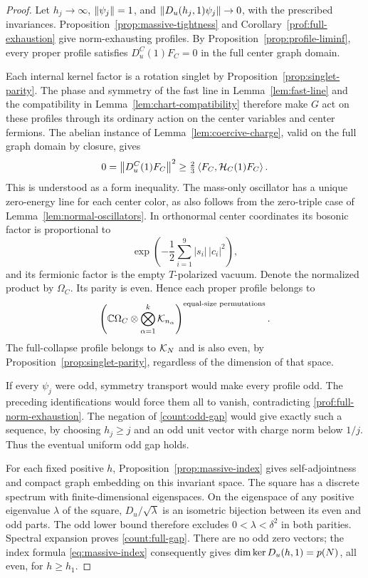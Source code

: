 \begin{proof}
Let \(h_j\to\infty\), \(\left\lVert \psi_j\right\rVert=1\), and
\(\left\lVert D_u(h_j,1)\psi_j\right\rVert\to0\), with the prescribed invariances.
Proposition~\ref{prop:massive-tightness} and
Corollary~\ref{prof:full-exhaustion} give norm-exhausting profiles. By
Proposition~\ref{prop:profile-liminf}, every proper profile satisfies
\(D_u^C(1)F_C=0\) in the full center graph domain.

Each internal kernel factor is a rotation singlet by
Proposition~\ref{prop:singlet-parity}. The phase and symmetry of the fast
line in Lemma~\ref{lem:fast-line} and the compatibility in
Lemma~\ref{lem:chart-compatibility} therefore make \(G\) act on these
profiles through its ordinary action on the center variables and center
fermions. The abelian instance of Lemma~\ref{lem:coercive-charge}, valid
on the full graph domain by closure, gives
\[
       0=\left\lVert D_u^C(1)F_C\right\rVert^2
          \ge\tfrac23\left\langle F_C,\mathcal H_C(1)F_C\right\rangle.
\]
This is understood as a form inequality. The mass-only oscillator has
a unique zero-energy line for each center color, as also follows from
the zero-triple case of Lemma~\ref{lem:normal-oscillators}. In orthonormal
center coordinates its bosonic factor is proportional to
\[
        \exp\left(-\frac12\sum_{i=1}^9|s_i|\,|c_i|^2\right),
\]
and its fermionic factor is the empty \(T\)-polarized vacuum. Denote the
normalized product by \(\Omega_C\). Its parity is even. Hence each proper
profile belongs to
\begin{equation}\label{count:proper-profile-kernel}
 \left(\mathbb C\Omega_C\otimes\bigotimes_{\alpha=1}^k\mathcal K_{n_\alpha}\right)
                  ^{\text{equal-size permutations}}.
\end{equation}
The full-collapse profile belongs to \(\mathcal K_N\) and is also even, by
Proposition~\ref{prop:singlet-parity}, regardless of the dimension of that
space.

If every \(\psi_j\) were odd, symmetry transport would make every profile
odd. The preceding identifications would force them all to vanish,
contradicting \eqref{prof:full-norm-exhaustion}. The negation of
\eqref{count:odd-gap} would give exactly such a sequence, by choosing
\(h_j\ge j\) and an odd unit vector with charge norm below \(1/j\).
Thus the eventual uniform odd gap holds.

For each fixed positive \(h\), Proposition~\ref{prop:massive-index} gives
self-adjointness and compact graph embedding on this invariant space.
The square has a discrete spectrum with finite-dimensional eigenspaces.
On the eigenspace of any positive eigenvalue \(\lambda\) of the square,
\(D_u/\sqrt\lambda\) is an isometric bijection between its even and odd
parts. The odd lower bound therefore excludes \(0<\lambda<\delta^2\)
in both parities. Spectral expansion proves
\eqref{count:full-gap}. There are no odd zero vectors; the index formula
\eqref{eq:massive-index} consequently gives
\(\dim\operatorname{ker} D_u(h,1)=p(N)\), all even, for \(h\ge h_1\).
\end{proof}

